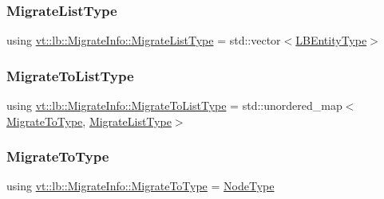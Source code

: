 \mbox{\label{structvt_1_1lb_1_1_migrate_info_ada3a64f80c7036f692d19c3b10bbac16}} 
\subsubsection{\texorpdfstring{Migrate\+List\+Type}{MigrateListType}}
{\footnotesize\ttfamily using \hyperlink{structvt_1_1lb_1_1_migrate_info_ada3a64f80c7036f692d19c3b10bbac16}{vt\+::lb\+::\+Migrate\+Info\+::\+Migrate\+List\+Type} =  std\+::vector$<$\hyperlink{namespacevt_a92ec26fb6644cd0ba7eb0ee70c96bee5}{L\+B\+Entity\+Type}$>$}

\mbox{\label{structvt_1_1lb_1_1_migrate_info_a849f608488ac05ab0942c1543933fa4d}} 
\subsubsection{\texorpdfstring{Migrate\+To\+List\+Type}{MigrateToListType}}
{\footnotesize\ttfamily using \hyperlink{structvt_1_1lb_1_1_migrate_info_a849f608488ac05ab0942c1543933fa4d}{vt\+::lb\+::\+Migrate\+Info\+::\+Migrate\+To\+List\+Type} =  std\+::unordered\+\_\+map$<$\hyperlink{structvt_1_1lb_1_1_migrate_info_a69403740694a22895d616924d243e32b}{Migrate\+To\+Type}, \hyperlink{structvt_1_1lb_1_1_migrate_info_ada3a64f80c7036f692d19c3b10bbac16}{Migrate\+List\+Type}$>$}

\mbox{\label{structvt_1_1lb_1_1_migrate_info_a69403740694a22895d616924d243e32b}} 
\subsubsection{\texorpdfstring{Migrate\+To\+Type}{MigrateToType}}
{\footnotesize\ttfamily using \hyperlink{structvt_1_1lb_1_1_migrate_info_a69403740694a22895d616924d243e32b}{vt\+::lb\+::\+Migrate\+Info\+::\+Migrate\+To\+Type} =  \hyperlink{namespacevt_a866da9d0efc19c0a1ce79e9e492f47e2}{Node\+Type}}



